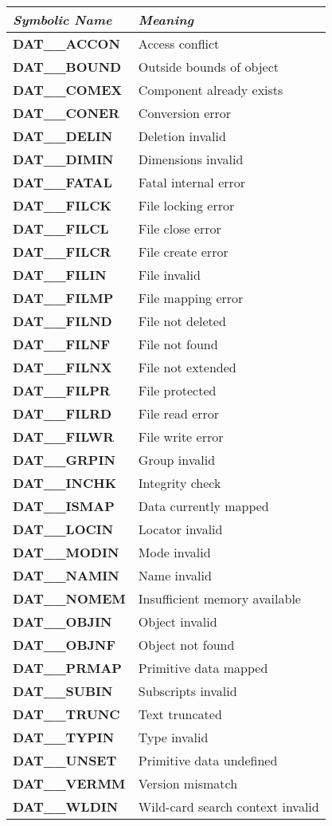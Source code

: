 \documentclass[11pt]{article}
\newcommand{\xlabel}[1]{}
\newcommand{\st}[1]{{\em{#1}}}
\begin{document}
\small
\begin{center}
\xlabel{table_of_HDS_error_codes}
\begin{tabular}{|l|l|} \hline
\st{Symbolic Name} & \st{Meaning}\\ \hline \hline
{\bf DAT\_\_ACCON} & Access conflict\\
{\bf DAT\_\_BOUND} & Outside bounds of object\\
{\bf DAT\_\_COMEX} & Component already exists\\
{\bf DAT\_\_CONER} & Conversion error\\
{\bf DAT\_\_DELIN} & Deletion invalid\\
{\bf DAT\_\_DIMIN} & Dimensions invalid\\
{\bf DAT\_\_FATAL} & Fatal internal error\\
{\bf DAT\_\_FILCK} & File locking error\\
{\bf DAT\_\_FILCL} & File close error\\
{\bf DAT\_\_FILCR} & File create error\\
{\bf DAT\_\_FILIN} & File invalid\\
{\bf DAT\_\_FILMP} & File mapping error\\
{\bf DAT\_\_FILND} & File not deleted\\
{\bf DAT\_\_FILNF} & File not found\\
{\bf DAT\_\_FILNX} & File not extended\\
{\bf DAT\_\_FILPR} & File protected\\
{\bf DAT\_\_FILRD} & File read error\\
{\bf DAT\_\_FILWR} & File write error\\
{\bf DAT\_\_GRPIN} & Group invalid\\
{\bf DAT\_\_INCHK} & Integrity check\\
{\bf DAT\_\_ISMAP} & Data currently mapped\\
{\bf DAT\_\_LOCIN} & Locator invalid\\
{\bf DAT\_\_MODIN} & Mode invalid\\
{\bf DAT\_\_NAMIN} & Name invalid\\
{\bf DAT\_\_NOMEM} & Insufficient memory available\\
{\bf DAT\_\_OBJIN} & Object invalid\\
{\bf DAT\_\_OBJNF} & Object not found\\
{\bf DAT\_\_PRMAP} & Primitive data mapped\\
{\bf DAT\_\_SUBIN} & Subscripts invalid\\
{\bf DAT\_\_TRUNC} & Text truncated\\
{\bf DAT\_\_TYPIN} & Type invalid\\
{\bf DAT\_\_UNSET} & Primitive data undefined\\
{\bf DAT\_\_VERMM} & Version mismatch\\
{\bf DAT\_\_WLDIN} & Wild-card search context invalid \\
\hline
\end{tabular}
\end{center}
\end{document}
